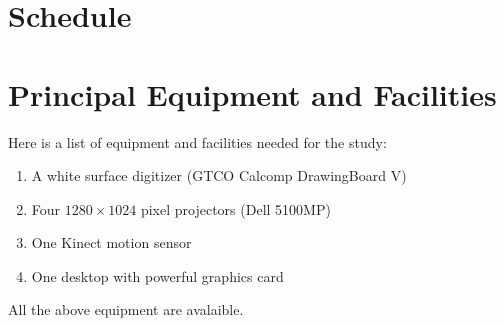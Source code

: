 \section{Schedule}
% 
% 
% 
% 
% 
% 
% 
% 

\section{Principal Equipment and Facilities}
Here is a list of equipment and facilities needed for the study:

\begin{enumerate}
  \item A white surface digitizer (GTCO Calcomp DrawingBoard V)
  \item Four $1280\times1024$ pixel projectors (Dell 5100MP)
  \item One Kinect motion sensor
  \item One desktop with powerful graphics card
\end{enumerate}

All the above equipment are avalaible.

